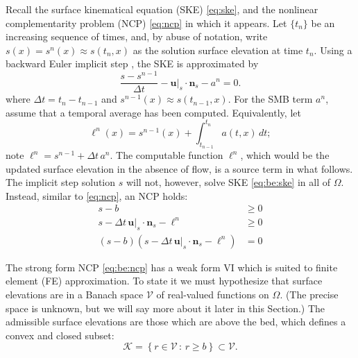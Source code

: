 \documentclass[hidelinks,onefignum,onetabnum,final]{siamart220329}  %
\newcommand{\bn}{\mathbf{n}}
\newcommand{\bu}{\mathbf{u}}
\newcommand{\cK}{\mathcal{K}}
\newcommand{\cV}{\mathcal{V}}
\begin{document}
Recall the surface kinematical equation (SKE) \eqref{eq:ske}, and the nonlinear complementarity problem (NCP) \eqref{eq:ncp} in which it appears.  Let $\{t_n\}$ be an increasing sequence of times, and, by abuse of notation, write $s(x) = s^n(x)\approx s(t_n,x)$ as the solution surface elevation at time $t_n$.  Using a backward Euler implicit step \cite{AscherPetzold1998}, the SKE is approximated by
\begin{equation}
\frac{s - s^{n-1}}{\Delta t} - \bu|_s \cdot \bn_s - a^n = 0. \label{eq:be:ske}
\end{equation}
where $\Delta t = t_n-t_{n-1}$ and $s^{n-1}(x) \approx s(t_{n-1},x)$.  For the SMB term $a^n$, assume that a temporal average has been computed.  Equivalently, let
\begin{equation}
\ell^n(x) = s^{n-1}(x) + \int_{t_{n-1}}^{t_n} a(t,x)\,dt; \label{eq:be:source}
\end{equation}
note $\ell^n=s^{n-1}+\Delta t\,a^n$.  The computable function $\ell^n$, which would be the updated surface elevation in the absence of flow, is a source term in what follows.  The implicit step solution $s$ will not, however, solve SKE \eqref{eq:be:ske} in all of $\Omega$.  Instead, similar to \eqref{eq:ncp}, an NCP holds:
\begin{subequations}
\label{eq:be:ncp}
\begin{align}
s - b &\ge 0 \label{eq:be:ncp:constraint} \\
s - \Delta t\,\bu|_s \cdot \bn_s - \ell^n &\ge 0 \\
(s - b) \left(s - \Delta t\,\bu|_s \cdot \bn_s - \ell^n\right) &= 0
\end{align}
\end{subequations}

The strong form NCP \eqref{eq:be:ncp} has a weak form VI which is suited to finite element (FE) approximation.  To state it we must hypothesize that surface elevations are in a Banach space $\cV$ of real-valued functions on $\Omega$.  (The precise space is unknown, but we will say more about it later in this Section.)  The admissible surface elevations are those which are above the bed, which defines a convex and closed subset:
\begin{equation}
\cK = \left\{r \in\cV\,:\,r \ge b\right\} \subset \cV.  \label{eq:be:admissible}
\end{equation}
\end{document}
